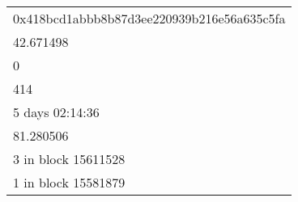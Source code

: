 \begin{tabular}{l}
\toprule
                                           \\
\midrule
0x418bcd1abbb8b87d3ee220939b216e56a635c5fa \\
                                 42.671498 \\
                                         0 \\
                                       414 \\
                           5 days 02:14:36 \\
                                 81.280506 \\
                       3 in block 15611528 \\
                       1 in block 15581879 \\
\bottomrule
\end{tabular}
